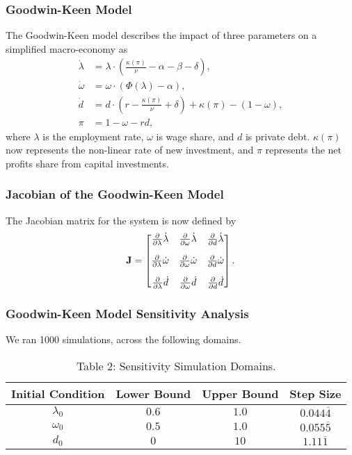 \documentclass{beamer}
\begin{document}
\begin{frame}
\frametitle{Goodwin-Keen Model}
The Goodwin-Keen model \citep{p8} describes the impact of three parameters on a simplified macro-economy as
\begin{equation}
\begin{split}
     \dot{\lambda} &= \lambda \cdot \left( \frac{\kappa(\pi)}{\nu} - \alpha - \beta - \delta \right),\\
    \dot{\omega} &= \omega \cdot (\Phi(\lambda) - \alpha),\\
    \dot{d} &= d\cdot\left(r-\frac{\kappa(\pi)}{\nu}+\delta\right)+\kappa(\pi)-(1-\omega), \\
    \pi &= 1-\omega-rd,
\end{split}
\end{equation}
where $\lambda$ is the employment rate, $\omega$ is wage share, and $d$ is private debt. $\kappa(\pi)$ now represents the non-linear rate of new investment, and $\pi$ represents the net profits share from capital investments.
\end{frame}
\begin{frame}
\frametitle{Jacobian of the Goodwin-Keen Model}
The Jacobian matrix for the system is now defined by 
\LARGE
\begin{equation} \label{eq:keenJ}
\mathbf J =
\begin{bmatrix}
    \pdv{\lambda}\dot{\lambda} & \pdv{\omega}\dot{\lambda} & \pdv{d}\dot{\lambda}\\[1em]
    \pdv{\lambda}\dot{\omega} & \pdv{\omega}\dot{\omega} & \pdv{d}\dot{\omega}\\[1em]
    \pdv{\lambda}\dot{d} & \pdv{\omega}\dot{d} & \pdv{d}\dot{d}
\end{bmatrix}.
\end{equation}
\normalsize
\end{frame}
\begin{frame}
\frametitle{Goodwin-Keen Model Sensitivity Analysis}
We ran 1000 simulations, across the following domains.
\begin{table}[]
\caption{Table 2: Sensitivity Simulation Domains.}
\centering
\begin{tabular}{|c|c|c|c|} \hline
  \textbf{Initial Condition} & \textbf{Lower Bound} & \textbf{Upper Bound} & \textbf{Step Size}  \\ \hline
$\lambda_0$ & $0.6$ & $1.0$ &  $0.044\overline 4$ \\ \hline
$\omega_0$ & $0.5$ & $1.0$ & $0.055\overline 5$  \\ \hline
$d_0$ & $0$ & $10$ & $1.11\overline 1$ \\
\hline
\end{tabular}
\end{table}
\end{frame}
\end{document}
